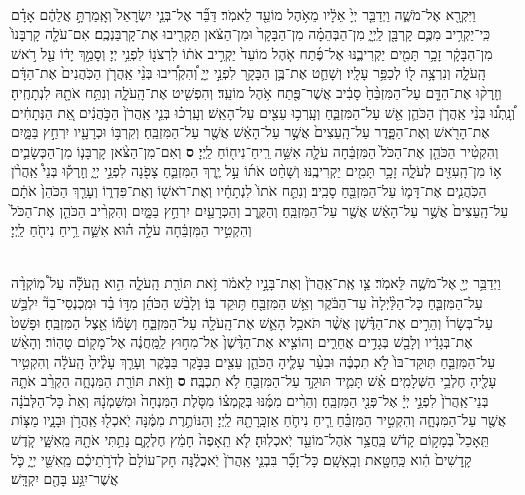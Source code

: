\documentclass[twoside, openany, parskip=half, 11pt]{book}
\begin{document}
\begin{footnotesize}
\begin{multicols}{2}
\\
 וַיִּקְרָ֖א אֶל־מֹשֶׁ֑ה וַיְדַבֵּ֤ר יְיָ֙ אֵלָ֔יו מֵאֹ֥הֶל מוֹעֵ֖ד לֵאמֹֽר׃ דַּבֵּ֞ר אֶל־בְּנֵ֤י יִשְׂרָאֵל֙ וְאָֽמַרְתָּ֣ אֲלֵהֶ֔ם אָדָ֗ם כִּֽי־יַקְרִ֥יב מִכֶּ֛ם קָרְבָּ֖ן לַֽיְיָ֑ מִן־הַבְּהֵמָ֗ה מִן־הַבָּקָר֙ וּמִן־הַצֹּ֔אן תַּקְרִ֖יבוּ אֶת־קָרְבַּנְכֶֽם׃ אִם־עֹלָ֤ה קָרְבָּנוֹ֙ מִן־הַבָּקָ֔ר זָכָ֥ר תָּמִ֖ים יַקְרִיבֶ֑נּוּ אֶל־פֶּ֜תַח אֹ֤הֶל מוֹעֵד֙ יַקְרִ֣יב אֹת֔וֹ לִרְצֹנ֖וֹ לִפְנֵ֥י יְיָ׃ 
 וְסָמַ֣ךְ יָד֔וֹ עַ֖ל רֹ֣אשׁ הָֽעֹלָ֑ה וְנִרְצָ֥ה ל֖וֹ לְכַפֵּ֥ר עָלָֽיו׃ 
 וְשָׁחַ֛ט אֶת־בֶּ֥ן הַבָּקָ֖ר לִפְנֵ֣י יְיָ֑ וְ֠הִקְרִ֠יבוּ בְּנֵ֨י אַֽהֲרֹ֤ן הַכֹּֽהֲנִים֙ אֶת־הַדָּ֔ם וְזָֽרְק֨וּ אֶת־הַדָּ֤ם עַל־הַמִּזְבֵּ֨חַ֙ סָבִ֔יב אֲשֶׁר־פֶּ֖תַח אֹ֥הֶל מוֹעֵֽד׃ וְהִפְשִׁ֖יט אֶת־הָֽעֹלָ֑ה וְנִתַּ֥ח אֹתָ֖הּ לִנְתָחֶֽיהָ׃ וְ֠נָֽתְנ֠וּ בְּנֵ֨י אַֽהֲרֹ֧ן הַכֹּהֵ֛ן אֵ֖שׁ עַל־הַמִּזְבֵּ֑חַ וְעָֽרְכ֥וּ עֵצִ֖ים עַל־הָאֵֽשׁ׃ וְעָֽרְכ֗וּ בְּנֵ֤י אַֽהֲרֹן֙ הַכֹּ֣הֲנִ֔ים אֵ֚ת הַנְּתָחִ֔ים אֶת־הָרֹ֖אשׁ וְאֶת־הַפָּ֑דֶר עַל־הָֽעֵצִים֙ אֲשֶׁ֣ר עַל־הָאֵ֔שׁ אֲשֶׁ֖ר עַל־הַמִּזְבֵּֽחַ׃ וְקִרְבּ֥וֹ וּכְרָעָ֖יו יִרְחַ֣ץ בַּמָּ֑יִם וְהִקְטִ֨יר הַכֹּהֵ֤ן אֶת־הַכֹּל֙ הַמִּזְבֵּ֔חָה עֹלָ֛ה אִשֵּׁ֥ה רֵֽיחַ־נִיח֖וֹחַ לַֽיְיָ׃ \textbf{ס}  וְאִם־מִן־הַצֹּ֨אן קָרְבָּנ֧וֹ מִן־הַכְּשָׂבִ֛ים א֥וֹ מִן־הָֽעִזִּ֖ים לְעֹלָ֑ה זָכָ֥ר תָּמִ֖ים יַקְרִיבֶֽנּוּ׃ וְשָׁחַ֨ט אֹת֜וֹ עַ֣ל יֶ֧רֶךְ הַמִּזְבֵּ֛חַ צָפֹ֖נָה לִפְנֵ֣י יְיָ֑ וְזָֽרְק֡וּ בְּנֵי֩ אַֽהֲרֹ֨ן הַכֹּֽהֲנִ֧ים אֶת־דָּמ֛וֹ עַל־הַמִּזְבֵּ֖חַ סָבִֽיב׃ וְנִתַּ֤ח אֹתוֹ֙ לִנְתָחָ֔יו וְאֶת־רֹאשׁ֖וֹ וְאֶת־פִּדְר֑וֹ וְעָרַ֤ךְ הַכֹּהֵן֙ אֹתָ֔ם עַל־הָֽעֵצִים֙ אֲשֶׁ֣ר עַל־הָאֵ֔שׁ אֲשֶׁ֖ר עַל־הַמִּזְבֵּֽחַ׃ וְהַקֶּ֥רֶב וְהַכְּרָעַ֖יִם יִרְחַ֣ץ בַּמָּ֑יִם וְהִקְרִ֨יב הַכֹּהֵ֤ן אֶת־הַכֹּל֙ וְהִקְטִ֣יר הַמִּזְבֵּ֔חָה עֹלָ֣ה ה֗וּא אִשֵּׁ֛ה רֵ֥יחַ נִיחֹ֖חַ לַֽיְיָ׃

\\
 וַיְדַבֵּ֥ר יְיָ֖ אֶל־מֹשֶׁ֥ה לֵּאמֹֽר׃ צַ֤ו אֶֽת־אַֽהֲרֹן֙ וְאֶת־בָּנָ֣יו לֵאמֹ֔ר זֹ֥את תּוֹרַ֖ת הָֽעֹלָ֑ה הִ֣וא הָֽעֹלָ֡ה עַל֩ מֽוֹקְדָ֨ה עַל־הַמִּזְבֵּ֤חַ כָּל־הַלַּ֨יְלָה֙ עַד־הַבֹּ֔קֶר וְאֵ֥שׁ הַמִּזְבֵּ֖חַ תּ֥וּקַד בּֽוֹ׃ וְלָבַ֨שׁ הַכֹּהֵ֜ן מִדּ֣וֹ בַ֗ד וּמִֽכְנְסֵי־בַד֘ יִלְבַּ֣שׁ עַל־בְּשָׂרוֹ֒ וְהֵרִ֣ים אֶת־הַדֶּ֗שֶׁן אֲשֶׁ֨ר תֹּאכַ֥ל הָאֵ֛שׁ אֶת־הָֽעֹלָ֖ה עַל־הַמִּזְבֵּ֑חַ וְשָׂמ֕וֹ אֵ֖צֶל הַמִּזְבֵּֽחַ׃  וּפָשַׁט֙ אֶת־בְּגָדָ֔יו וְלָבַ֖שׁ בְּגָדִ֣ים אֲחֵרִ֑ים וְהוֹצִ֤יא אֶת־הַדֶּ֨שֶׁן֙ אֶל־מִח֣וּץ לַֽמַּֽחֲנֶ֔ה אֶל־מָק֖וֹם טָהֽוֹר׃ וְהָאֵ֨שׁ עַל־הַמִּזְבֵּ֤חַ תּֽוּקַד־בּוֹ֙ לֹ֣א תִכְבֶּ֔ה וּבִעֵ֨ר עָלֶ֧יהָ הַכֹּהֵ֛ן עֵצִ֖ים בַּבֹּ֣קֶר בַּבֹּ֑קֶר וְעָרַ֤ךְ עָלֶ֨יהָ֙ הָֽעֹלָ֔ה וְהִקְטִ֥יר עָלֶ֖יהָ חֶלְבֵ֥י הַשְּׁלָמִֽים׃ אֵ֗שׁ תָּמִ֛יד תּוּקַ֥ד עַל־הַמִּזְבֵּ֖חַ לֹ֥א תִכְבֶּֽה׃ \textbf{ס}  וְזֹ֥את תּוֹרַ֖ת הַמִּנְחָ֑ה הַקְרֵ֨ב אֹתָ֤הּ בְּנֵי־אַֽהֲרֹן֙ לִפְנֵ֣י יְיָ֔ אֶל־פְּנֵ֖י הַמִּזְבֵּֽחַ׃ וְהֵרִ֨ים מִמֶּ֜נּוּ בְּקֻמְצ֗וֹ מִסֹּ֤לֶת הַמִּנְחָה֙ וּמִשַּׁמְנָ֔הּ וְאֵת֙ כָּל־הַלְּבֹנָ֔ה אֲשֶׁ֖ר עַל־הַמִּנְחָ֑ה וְהִקְטִ֣יר הַמִּזְבֵּ֗חַ רֵ֧יחַ נִיחֹ֛חַ אַזְכָּֽרָתָ֖הּ לַֽיְיָ׃ וְהַנּוֹתֶ֣רֶת מִמֶּ֔נָּה יֹֽאכְל֖וּ אַֽהֲרֹ֣ן וּבָנָ֑יו מַצּ֤וֹת תֵּֽאָכֵל֙ בְּמָק֣וֹם קָדֹ֔שׁ בַּֽחֲצַ֥ר אֹֽהֶל־מוֹעֵ֖ד יֹֽאכְלֽוּהָ׃ לֹ֤א תֵֽאָפֶה֙ חָמֵ֔ץ חֶלְקָ֛ם נָתַ֥תִּי אֹתָ֖הּ מֵֽאִשָּׁ֑י קֹ֤דֶשׁ קָֽדָשִׁים֙ הִ֔וא כַּֽחַטָּ֖את וְכָֽאָשָֽׁם׃ כָּל־זָכָ֞ר בִּבְנֵ֤י אַֽהֲרֹן֙ יֹֽאכֲלֶ֔נָּה חָק־עוֹלָם֙ לְדֹרֹ֣תֵיכֶ֔ם מֵֽאִשֵּׁ֖י יְיָ֑ כֹּ֛ל אֲשֶׁר־יִגַּ֥ע בָּהֶ֖ם יִקְדָּֽשׁ׃


\end{multicols}
\end{footnotesize}
\end{document}

